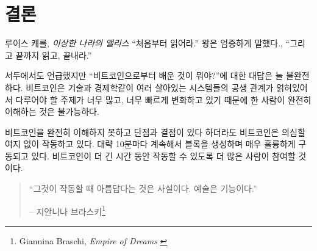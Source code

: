 \label{ch:conclusion}

\chapter*{결론}

\begin{chapquote}{루이스 캐롤, \textit{이상한 나라의 앨리스}}
	\enquote{처음부터 읽어라.} 왕은 엄중하게 말했다., \enquote{그리고 끝까지 읽고, 끝내라.}
\end{chapquote}

\begin{comment}
	As mentioned in the beginning, I think that any answer to the
	question \textit{“What have you learned from Bitcoin?”} will always be incomplete. The
	symbiosis of what can be seen as multiple living systems -- Bitcoin, the
	technosphere, and economics -- is too intertwined, the topics too numerous, and
	things are moving too fast to ever be fully understood by a single person.
\end{comment}
서두에서도 언급했지만 \enquote{비트코인으로부터 배운 것이 뭐야?}에 대한 대답은 
늘 불완전하다.
비트코인은 기술과 경제학같이 여러 살아있는 시스템들의 공생 관계가 얽혀있어서 다루어야 할 주제가 너무 많고, 
너무 빠르게 변화하고 있기 때문에 한 사람이 완전히 이해하는 것은 불가능하다.

\begin{comment}
	Even without understanding it fully, and even with all its quirks and seeming
	shortcomings, Bitcoin undoubtedly works. It keeps producing blocks roughly every
	ten minutes and does so beautifully. The longer Bitcoin continues to work, the
	more people will opt-in to use it.
\end{comment}
비트코인을 완전히 이해하지 못하고 단점과 결점이 있다 하더라도 
비트코인은 의심할 여지 없이 작동하고 있다.
대략 10분마다 계속해서 블록을 생성하며 매우 훌륭하게 구동되고 있다.
비트코인이 더 긴 시간 동안 작동할 수 있도록 더 많은 사람이 참여할 것이다.

\begin{quotation}\begin{samepage}
		\enquote{그것이 작동할 때 아름답다는 것은 사실이다. 예술은 기능이다.}
		\begin{flushright} -- 지안니나 브라스키\footnote{Giannina Braschi, \textit{Empire of Dreams} \cite{braschi2011empire}}
\end{flushright}\end{samepage}\end{quotation}

